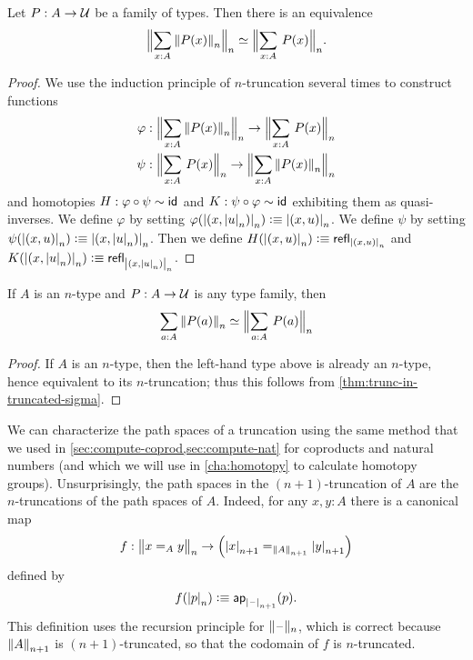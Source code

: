 \begin{thm}\label{thm:trunc-in-truncated-sigma}
Let $P:A\to\type$ be a family of types. Then there is an equivalence
\begin{equation*}
\eqv{\Trunc n{\sm{x:A}\trunc n{P(x)}}}{\Trunc n{\sm{x:A}P(x)}}.
\end{equation*}
\end{thm}

\begin{proof}
We use the induction principle of $n$-truncation several times to construct
functions
\begin{align*}
\varphi & : \Trunc n{\sm{x:A}\trunc n{P(x)}}\to\Trunc n{\sm{x:A}P(x)}\\
\psi & : \Trunc n{\sm{x:A}P(x)}\to \Trunc n{\sm{x:A} \trunc n{P(x)}}
\end{align*}
and homotopies $H:\varphi\circ\psi\htpy \idfunc$ and $K:\psi\circ\varphi\htpy
\idfunc$ exhibiting them as quasi-inverses.
We define $\varphi$ by setting $\varphi(\tproj n{\pairr{x,\tproj nu}})\defeq\tproj n{\pairr{x,u}}$.
We define $\psi$ by setting $\psi(\tproj n{\pairr{x,u}})\defeq\tproj n{\pairr{x,\tproj nu}}$.
Then we define $H(\tproj n{\pairr{x,u}})\defeq \refl{\tproj n{\pairr{x,u}}}$ and
$K(\tproj n{\pairr{x,\tproj nu}})\defeq \refl{\tproj n{\pairr{x,\tproj nu}}}$.
\end{proof}

\begin{cor}\label{thm:refl-over-ntype-base}
  If $A$ is an $n$-type and $P:A\to\type$ is any type family, then
  \[ \eqv{\sm{a:A} \trunc n{P(a)}}{\Trunc n{\sm{a:A}P(a)}} \]
\end{cor}
\begin{proof}
  If $A$ is an $n$-type, then the left-hand type above is already an $n$-type, hence equivalent to its $n$-truncation; thus this follows from \autoref{thm:trunc-in-truncated-sigma}.
\end{proof}

We can characterize the path spaces of a truncation using the same method that we used in \autoref{sec:compute-coprod,sec:compute-nat} for
coproducts and natural numbers (and which we will use in \autoref{cha:homotopy} to calculate homotopy groups).
Unsurprisingly, the path spaces in the $(n+1)$-truncation of $A$ are the $n$-truncations of the path spaces of $A$.
Indeed, for any $x,y:A$ there is a canonical map
\begin{equation}
  f:\ttrunc n{x=_Ay}\to \Big(\tproj {n+1}x=_{\trunc{n+1}A}\tproj {n+1}y\Big)\label{eq:path-trunc-map}
\end{equation}
defined by
\[f(\tproj n{p})\defeq \apfunc{\tprojf {n+1}}(p). \]
This definition uses the recursion principle for $\truncf n$, which is correct because $\trunc {n+1}A$ is $(n+1)$-truncated, so that the
codomain of $f$ is $n$-truncated.

